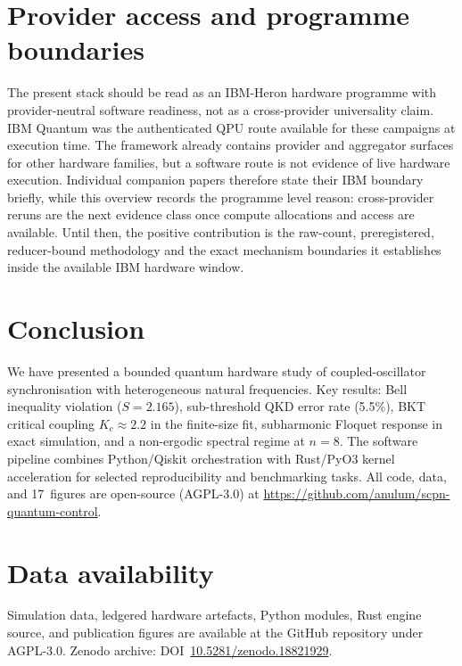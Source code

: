 \documentclass[twocolumn,prl,superscriptaddress,showpacs,floatfix]{revtex4-2}
\begin{document}
\section{Provider access and programme boundaries}

The present stack should be read as an IBM-Heron hardware programme with
provider-neutral software readiness, not as a cross-provider universality
claim. IBM Quantum was the authenticated QPU route available for these
campaigns at execution time. The framework already contains provider and
aggregator surfaces for other hardware families, but a software route is not
evidence of live hardware execution. Individual companion papers therefore
state their IBM boundary briefly, while this overview records the programme
level reason: cross-provider reruns are the next evidence class once compute
allocations and access are available. Until then, the positive contribution is
the raw-count, preregistered, reducer-bound methodology and the exact
mechanism boundaries it establishes inside the available IBM hardware window.

\section{Conclusion}

We have presented a bounded quantum hardware study of
coupled-oscillator synchronisation with heterogeneous natural
frequencies. Key results: Bell inequality violation ($S = 2.165$),
sub-threshold QKD error rate (5.5\%), BKT critical coupling
$K_c \approx 2.2$ in the finite-size fit, subharmonic Floquet response in
exact simulation, and a non-ergodic spectral regime at $n = 8$. The
software pipeline combines Python/Qiskit orchestration with Rust/PyO3
kernel acceleration for selected reproducibility and benchmarking tasks.
All code, data, and 17~figures are open-source (AGPL-3.0) at
\url{https://github.com/anulum/scpn-quantum-control}.

\section*{Data availability}

Simulation data, ledgered hardware artefacts, Python modules, Rust engine
source, and publication figures are available at the GitHub repository under
AGPL-3.0. Zenodo archive:
DOI~\href{https://doi.org/10.5281/zenodo.18821929}{10.5281/zenodo.18821929}.
\end{document}
